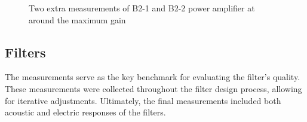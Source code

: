 \begin{figure}[H]
\begin{subfigure}[t]{0.5\linewidth}
\captionsetup{justification=raggedright, labelfont=bf}
\label{B2 PA measurements 2}
\end{subfigure}
\caption{Two extra measurements of B2-1 and B2-2 power amplifier at around the maximum gain}

\end{figure}

\subsection{Filters}
The measurements serve as the key benchmark for evaluating the filter's quality. These measurements were collected throughout the filter design process, allowing for iterative adjustments. Ultimately, the final measurements included both acoustic and electric responses of the filters.

